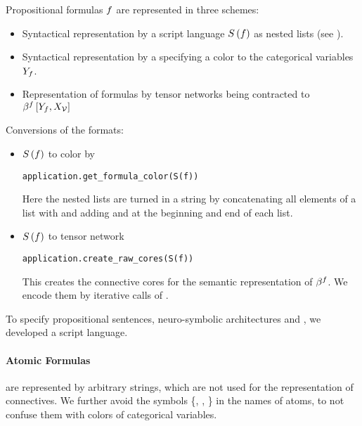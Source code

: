 Propositional formulas $f$ are represented in three schemes:
\begin{itemize}
    \item Syntactical representation by a script language $S\left(f\right)$ as nested lists (see ).
    \item Syntactical representation by a  specifying a color to the categorical variables $Y_{f}$.
    \item Representation of formulas by tensor networks being contracted to $\beta^{f}\left[Y_{f},X_{\mathcal{V}}\right]$
\end{itemize}

Conversions of the formats:
\begin{itemize}
    \item $S\left(f\right)$ to color by
    \begin{lstlisting}
application.get_formula_color(S(f))
    \end{lstlisting}
    Here the nested lists are turned in a string by concatenating all elements of a list with \stringof{\_} and adding \stringof{[} and \stringof{]} at the beginning and end of each list.
    \item  $S\left(f\right)$ to tensor network
    \begin{lstlisting}
application.create_raw_cores(S(f))
    \end{lstlisting}
    This creates the connective cores for the semantic representation of $\beta^{f}$.
    We encode them by iterative calls of .
\end{itemize}


\label{subsec:scriptLanguage}

To specify propositional sentences, neuro-symbolic architectures and \MarkovLogicNetworks{}, we developed a script language.


\paragraph{Atomic Formulas} are represented by arbitrary strings, which are not used for the representation of connectives.
We further avoid the symbols \{\stringof{(}, \stringof{)}, \stringof{\_}\} in the names of atoms, to not confuse them with colors of categorical variables.

